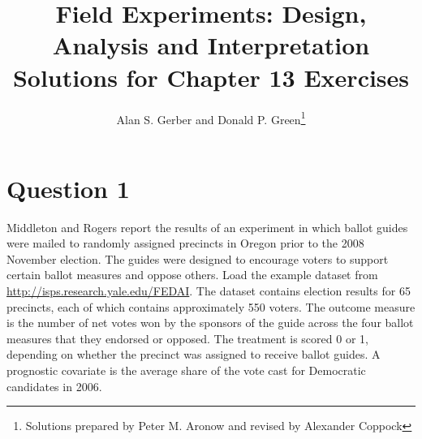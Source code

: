 \documentclass[11pt,notitlepage]{article}\usepackage[]{graphicx}\usepackage[]{color}
\title{Field Experiments: Design, Analysis and Interpretation \\
Solutions for Chapter 13 Exercises}
\author{Alan S. Gerber and Donald P. Green\footnote{Solutions prepared by Peter M. Aronow and revised by Alexander Coppock}}
\date{\vspace{-5ex}}
\begin{document}
\maketitle


\section*{Question 1}
Middleton and Rogers report the results of an experiment in which ballot guides were mailed to randomly assigned precincts in Oregon prior to the 2008 November election. The guides were designed to encourage voters to support certain ballot measures and oppose others. Load the example dataset from \url{http://isps.research.yale.edu/FEDAI}. The dataset contains election results for 65 precincts, each of which contains approximately 550 voters. The outcome measure is the number of net votes won by the sponsors of the guide across the four ballot measures that they endorsed or opposed. The treatment is scored 0 or 1, depending on whether the precinct was assigned to receive ballot guides. A prognostic covariate is the average share of the vote cast for Democratic candidates in 2006.
\end{document}
